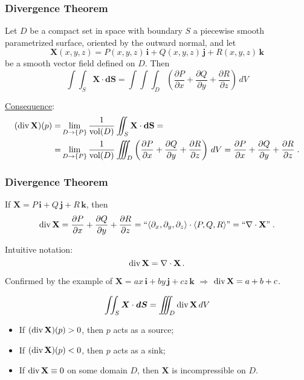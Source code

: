 \begin{frame}
  \frametitle{Divergence Theorem}

\begin{theorem}{\rm
  Let $D$ be a compact set in space with boundary $S$ a piecewise smooth parametrized surface, oriented by the outward normal, and let
%
$$\textbf{X}(x,y,z) = P(x,y,z) \, \textbf{i} + Q(x,y,z) \, \textbf{j} + R(x,y,z)\, \textbf{k}$$
%
be a smooth vector field defined on $D$. Then
%
$$\int\!\!\!\int_S \bm{X} \cdot \bm{dS} = \int\!\!\!\!\!\int\!\!\!\!\!\int_D \left(\frac{\partial P}{\partial x}+ \frac{\partial Q}{\partial y} + \frac{\partial R}{\partial z} \right) \, dV$$
}\end{theorem}
%
\pause \underline{Consequence}:
%
\begin{align*}
  (\divg \textbf{X}) (p) = &
\lim_{D\to \{P\}} \frac{1}{\text{vol}(D)}\int\!\!\!\!\!\int_S \textbf{X} \cdot \textbf{dS}  = \\
= & \lim_{D\to \{P\}} \frac{1}{\text{vol}(D)}\int\!\!\!\!\!\int\!\!\!\!\!\int_D \left(\frac{\partial P}{\partial x}+ \frac{\partial Q}{\partial y} + \frac{\partial R}{\partial z} \right) \, dV =
  \frac{\partial P}{\partial x}+ \frac{\partial Q}{\partial y} + \frac{\partial R}{\partial z}\; .
\end{align*}


\end{frame}

\begin{frame}
  \frametitle{Divergence Theorem}

%
If $\textbf{X} = P\, \textbf{i} + Q\, \textbf{j} +R\, \textbf{k}$, then
%
$$\operatorname{div} \textbf{X} = \frac{\partial P}{\partial x}+ \frac{\partial Q}{\partial y} + \frac{\partial R}{\partial z}  = ``\langle \partial_x, \partial_y, \partial_z \rangle \cdot \langle P, Q, R\rangle" =  ``\nabla \cdot \textbf{X}"\; .$$

Intuitive notation:
%
$$\operatorname{div} \textbf{X} = \nabla \cdot \textbf{X}\, .$$

\pause Confirmed by the example of $\textbf{X} = ax \, \textbf{i} + by\, \textbf{j} + cz\, \textbf{k}$ $\Longrightarrow$ $\operatorname{div} \textbf{X} = a+b+c$.\pause

\begin{theorem}
$$\int\!\!\!\int_S \bm{X} \cdot \bm{dS} = \int\!\!\!\!\!\int\!\!\!\!\!\int_D \divg \textbf{X} \, dV$$
\end{theorem}

\begin{itemize}
  \item \pause If $(\operatorname{div} \textbf{X})(p)>0$, then \pause $p$ acts as a source;
  \item \pause If $(\operatorname{div} \textbf{X})(p)<0$, then \pause $p$ acts as a sink;
  \item \pause If $\operatorname{div} \textbf{X} \equiv 0$ on some domain $D$, then \pause $\textbf{X}$ is incompressible on $D$.
\end{itemize}

\end{frame}

